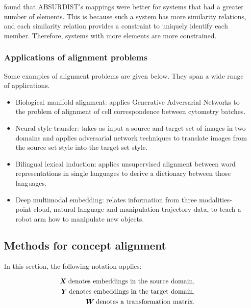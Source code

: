 \cite{GOLDSTONE2002295} found that ABSURDIST's mappings were better for systems that had a greater number of elements. This is because such a system has more similarity relations, and each similarity relation provides a constraint to uniquely identify each member. Therefore, systems with more elements are more constrained. 

\subsubsection{Applications of alignment problems}

Some examples of alignment problems are given below. They span a wide range of applications. 

\begin{itemize}
    \item Biological manifold alignment: \cite{magan} applies Generative Adversarial Networks \cite{GAN} to the problem of alignment of cell correspondence between cytometry batches.
    \item Neural style transfer: \cite{CycleGAN} takes as input a source and target set of images in two domains and applies adversarial network techniques to translate images from the source set style into the target set style. 
    \item Bilingual lexical induction: \cite{wordtranslationwithoutparalleldata} applies unsupervised alignment between word representations in single languages to derive a dictionary between those languages.
    \item Deep multimodal embedding: \cite{DeepMultimodalEmbedding} relates information from three modalities- point-cloud, natural language and manipulation trajectory data, to teach a robot arm  how to manipulate new objects. 
\end{itemize}

\subsection{Methods for concept alignment}

In this section, the following notation applies:

\begin{equation}
\begin{split}
    \boldsymbol{X} \medspace \text{denotes embeddings in the source domain},\\
    \boldsymbol{Y} \medspace \text{denotes embeddings in the target domain},\\
    \boldsymbol{W} \medspace \text{denotes a transformation matrix}.\\
\end{split}
\end{equation}

